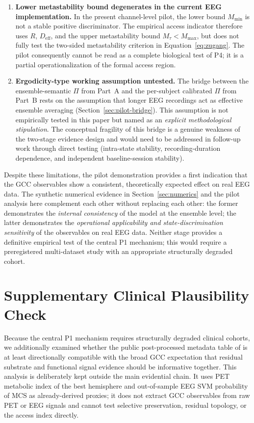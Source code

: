 ﻿\documentclass[11pt,a4paper]{article}
\theoremstyle{plain}
\theoremstyle{definition}
\theoremstyle{remark}
\begin{document}
\begin{enumerate}
\item \textbf{Lower metastability bound degenerates in the current EEG implementation.} In the present channel-level pilot, the lower bound $M_{\min}$ is not a stable positive discriminator. The empirical access indicator therefore uses $R$, $D_{\mathrm{eff}}$, and the upper metastability bound $M_\tau < M_{\max}$, but does not fully test the two-sided metastability criterion in Equation~\eqref{eq:zugang}. The pilot consequently cannot be read as a complete biological test of P4; it is a partial operationalization of the formal access region.

\item \textbf{Ergodicity-type working assumption untested.} The bridge between the ensemble-semantic $\Pi$ from Part~A and the per-subject calibrated $\Pi$ from Part~B rests on the assumption that longer EEG recordings act as effective ensemble averaging (Section~\ref{sec:pilot-bridge}). This assumption is not empirically tested in this paper but named as an \emph{explicit methodological stipulation}. The conceptual fragility of this bridge is a genuine weakness of the two-stage evidence design and would need to be addressed in follow-up work through direct testing (intra-state stability, recording-duration dependence, and independent baseline-session stability).
\end{enumerate}

Despite these limitations, the pilot demonstration provides a first indication that the GCC observables show a consistent, theoretically expected effect on real EEG data. The synthetic numerical evidence in Section~\ref{sec:numerics} and the pilot analysis here complement each other without replacing each other: the former demonstrates the \emph{internal consistency} of the model at the ensemble level; the latter demonstrates the \emph{operational applicability and state-discrimination sensitivity} of the observables on real EEG data. Neither stage provides a definitive empirical test of the central P1 mechanism; this would require a preregistered multi-dataset study with an appropriate structurally degraded cohort.


\section{Supplementary Clinical Plausibility Check}
\label{sec:doc-metadata}

Because the central P1 mechanism requires structurally degraded clinical cohorts, we additionally examined whether the public post-processed metadata table of \citet{hermann2021} is at least directionally compatible with the broad GCC expectation that residual substrate and functional signal evidence should be informative together. This analysis is deliberately kept outside the main evidential chain. It uses PET metabolic index of the best hemisphere and out-of-sample EEG SVM probability of MCS as already-derived proxies; it does not extract GCC observables from raw PET or EEG signals and cannot test selective preservation, residual topology, or the access index directly.
\end{document}
